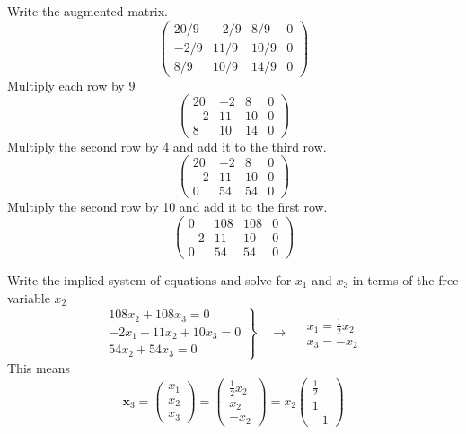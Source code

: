 \documentclass[12pt]{article}
\begin{document}
Write the augmented matrix.
$$
\left(\begin{array}{rrr|r}
20 / 9 & -2 / 9 & 8 / 9 & 0 \\
-2 / 9 & 11 / 9 & 10 / 9 & 0 \\
8 / 9 & 10 / 9 & 14 / 9 & 0
\end{array}\right)
$$
Multiply each row by \(9\)
$$
\left(\begin{array}{rrr|r}
20 & -2 & 8 & 0 \\
-2 & 11 & 10 & 0 \\
8 & 10 & 14 & 0
\end{array}\right)
$$
Multiply the second row by 4 and add it to the third row.
$$
\left(\begin{array}{rrr|r}
20 & -2 & 8 & 0 \\
-2 & 11 & 10 & 0 \\
0 & 54 & 54 & 0
\end{array}\right)
$$
Multiply the second row by 10 and add it to the first row.
$$
\left(\begin{array}{rrr|r}
0 & 108 & 108 & 0 \\
-2 & 11 & 10 & 0 \\
0 & 54 & 54 & 0
\end{array}\right)
$$

Write the implied system of equations and solve for \(x_{1}\) and \(x_{3}\) in terms
of the free variable \(x_{2}\) 
$$
\left.\begin{array}{r}
108 x_{2}+108 x_{3}=0 \\
-2 x_{1}+11 x_{2}+10 x_{3}=0 \\
54 x_{2}+54 x_{3}=0
\end{array}\right\} \quad \rightarrow \quad \begin{array}{l}
x_{1}=\frac{1}{2} x_{2} \\
x_{3}=-x_{2}
\end{array}
$$
This means
$$
\mathbf{x}_{3}=\left(\begin{array}{l}
x_{1} \\
x_{2} \\
x_{3}
\end{array}\right)=\left(\begin{array}{c}
\frac{1}{2} x_{2} \\
x_{2} \\
-x_{2}
\end{array}\right)=x_{2}\left(\begin{array}{c}
\frac{1}{2} \\
1 \\
-1
\end{array}\right)
$$
\end{document}

